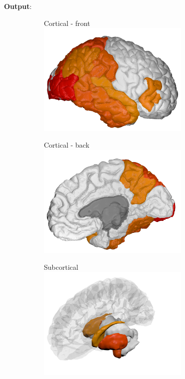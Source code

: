 \documentclass[8pt,xcolor=table]{beamer}
\begin{document}
\begin{frame}[label=current]
\textbf{Output}:
\begin{figure}
 \begin{subfigure}{0.3\textwidth}
 \centering
 Cortical - front
 \includegraphics[width=0.8\textwidth]{cortical-front_1}
 \end{subfigure}
 \begin{subfigure}{0.3\textwidth}
 \centering
 Cortical - back
 \includegraphics[width=0.8\textwidth]{cortical-back_1}
 \end{subfigure}
 \begin{subfigure}{0.3\textwidth}
 \centering
 Subcortical
 \includegraphics[width=0.8\textwidth]{subcortical_1}
 \end{subfigure}
 


\end{figure}
\end{frame}
\end{document}
